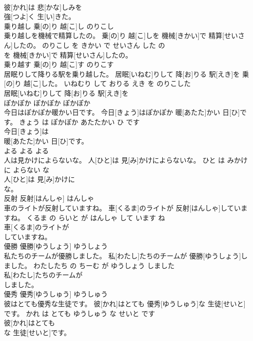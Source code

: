 \documentclass[8pt]{extreport}
\begin{document}
\begin{CJK}{UTF8}{min}
\\	彼[かれ]は 悲[かな]しみを
\\	強[つよ]く 生[い]きた。			
\\	乗り越し	乗[の]り 越[こ]し	のりこし	
\\	乗り越しを機械で精算したの。	乗[の]り 越[こ]しを 機械[きかい]で 精算[せいさん]したの。	のりこし を きかい で せいさん した の	
\\	を 機械[きかい]で 精算[せいさん]したの。			
\\	乗り越す	乗[の]り 越[こ]す	のりこす	
\\	居眠りして降りる駅を乗り越した。	居眠[いねむ]りして 降[お]りる 駅[えき]を 乗[の]り 越[こ]した。	いねむり して おりる えき を のりこした	
\\	居眠[いねむ]りして 降[お]りる 駅[えき]を
\\	ぽかぽか	ぽかぽか	ぽかぽか	
\\	今日はぽかぽか暖かい日です。	今日[きょう]はぽかぽか 暖[あたた]かい 日[ひ]です。	きょう は ぽかぽか あたたかい ひ です	
\\	今日[きょう]は
\\	暖[あたた]かい 日[ひ]です。			
\\	よる	よる	よる	
\\	人は見かけによらないな。	人[ひと]は 見[み]かけによらないな。	ひと は みかけ に よらない な	
\\	人[ひと]は 見[み]かけに
\\	な。			
\\	反射	反射[はんしゃ]	はんしゃ	
\\	車のライトが反射していますね。	車[くるま]のライトが 反射[はんしゃ]していますね。	くるま の らいと が はんしゃ して います ね	
\\	車[くるま]のライトが
\\	していますね。			
\\	優勝	優勝[ゆうしょう]	ゆうしょう	
\\	私たちのチームが優勝しました。	私[わたし]たちのチームが 優勝[ゆうしょう]しました。	わたしたち の ちーむ が ゆうしょう しました	
\\	私[わたし]たちのチームが
\\	しました。			
\\	優秀	優秀[ゆうしゅう]	ゆうしゅう	
\\	彼はとても優秀な生徒です。	彼[かれ]はとても 優秀[ゆうしゅう]な 生徒[せいと]です。	かれ は とても ゆうしゅう な せいと です	
\\	彼[かれ]はとても
\\	な 生徒[せいと]です。			

\end{CJK}
\end{document}
